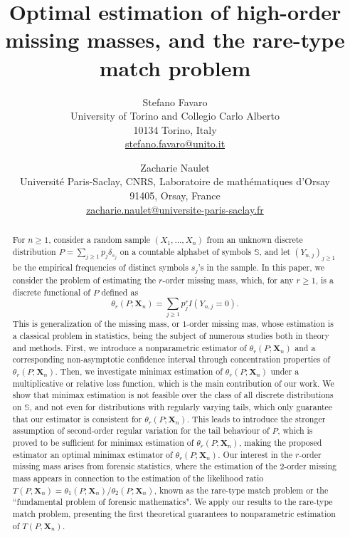 \documentclass{article}
\title{Optimal estimation of high-order missing masses, and the rare-type match problem}
\author{%
  Stefano Favaro\\
  University of Torino and Collegio Carlo Alberto\\
  10134 Torino, Italy\\
  \url{stefano.favaro@unito.it}
  \and
  Zacharie Naulet\\Université Paris-Saclay, CNRS, Laboratoire de mathématiques d’Orsay\\
  91405, Orsay, France\\
  \url{zacharie.naulet@universite-paris-saclay.fr}}
\date{}
\newcommand{\1}{\boldsymbol{1}}
\theoremstyle{plain}
\begin{document}
\maketitle


\begin{abstract}
For $n\geq1$, consider a random sample $(X_{1},\ldots,X_{n})$ from an unknown discrete distribution $P=\sum_{j\geq1}p_{j}\delta_{s_{j}}$ on a countable alphabet of symbols $\mathbb{S}$, and let $(Y_{n,j})_{j\geq1}$ be the empirical frequencies of distinct symbols $s_{j}$'s in the sample. In this paper, we consider the problem of estimating the $r$-order missing mass, which, for any $r\geq1$, is a discrete functional of $P$ defined as
\begin{displaymath}
\theta_{r}(P;\mathbf{X}_{n})=\sum_{j\geq1}p^{r}_{j}I(Y_{n,j}=0).
\end{displaymath}
This is generalization of the missing mass, or $1$-order missing mas, whose estimation is a classical problem in statistics, being the subject of numerous studies both in theory and methods. First, we introduce a nonparametric estimator of $\theta_{r}(P;\mathbf{X}_{n})$ and a corresponding non-asymptotic confidence interval through concentration properties of $\theta_{r}(P;\mathbf{X}_{n})$. Then, we investigate minimax estimation of $\theta_{r}(P;\mathbf{X}_{n})$ under a multiplicative or relative loss function, which is the main contribution of our work. We show that minimax estimation is not feasible over the class of all discrete distributions on $\mathbb{S}$, and not even for distributions with regularly varying tails, which only guarantee that our estimator is consistent for $\theta_{r}(P;\mathbf{X}_{n})$. This leads to introduce the stronger assumption of second-order regular variation for the tail behaviour of $P$, which is proved to be sufficient for minimax estimation of $\theta_r(P;\mathbf{X}_{n})$, making the proposed estimator an optimal minimax estimator of $\theta_{r}(P;\mathbf{X}_{n})$. Our interest in the $r$-order missing mass arises from forensic statistics, where the estimation of the $2$-order missing mass appears in connection to the estimation of the likelihood ratio $T(P,\mathbf{X}_{n})=\theta_{1}(P;\mathbf{X}_{n})/\theta_{2}(P;\mathbf{X}_{n})$, known as the rare-type match problem or the ``fundamental problem of forensic mathematics". We apply our results to the rare-type match problem, presenting the first theoretical guarantees to nonparametric estimation of $T(P,\mathbf{X}_{n})$.
\end{abstract}
\end{document}
